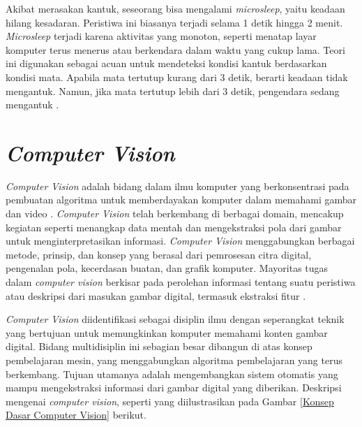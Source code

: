     Akibat merasakan kantuk, seseorang bisa mengalami \textit{microsleep}, yaitu keadaan hilang kesadaran. Peristiwa ini biasanya terjadi selama 1 detik hingga 2 menit. \textit{Microsleep} terjadi karena aktivitas yang monoton, seperti menatap layar komputer terus menerus atau berkendara dalam waktu yang cukup lama. Teori ini digunakan sebagai acuan untuk mendeteksi kondisi kantuk berdasarkan kondisi mata. Apabila mata tertutup kurang dari 3 detik, berarti keadaan tidak mengantuk. Namun, jika mata tertutup lebih dari 3 detik, pengendara sedang mengantuk \cite{puteri2020deteksi}.

\section{\textit{Computer Vision}}

    \textit{Computer Vision} adalah bidang dalam ilmu komputer yang berkonsentrasi pada pembuatan algoritma untuk memberdayakan komputer dalam memahami gambar dan video \cite{Guntara2023}. \textit{Computer Vision }telah berkembang di berbagai domain, mencakup kegiatan seperti menangkap data mentah dan mengekstraksi pola dari gambar untuk menginterpretasikan informasi. \textit{Computer Vision} menggabungkan berbagai metode, prinsip, dan konsep yang berasal dari pemrosesan citra digital, pengenalan pola, kecerdasan buatan, dan grafik komputer. Mayoritas tugas dalam \textit{computer vision} berkisar pada perolehan informasi tentang suatu peristiwa atau deskripsi dari masukan gambar digital, termasuk ekstraksi fitur \cite{Noerifanza2022}. 


    \textit{Computer Vision} diidentifikasi sebagai disiplin ilmu dengan seperangkat teknik yang bertujuan untuk memungkinkan komputer memahami konten gambar digital. Bidang multidisiplin ini sebagian besar dibangun di atas konsep pembelajaran mesin, yang menggabungkan algoritma pembelajaran yang terus berkembang. Tujuan utamanya adalah mengembangkan sistem otomatis yang mampu mengekstraksi informasi dari gambar digital yang diberikan.  Deskripsi mengenai \textit{computer vision}, seperti yang diilustrasikan pada Gambar \ref{Konsep Dasar Computer Vision} \cite{Guntara2023} berikut.


